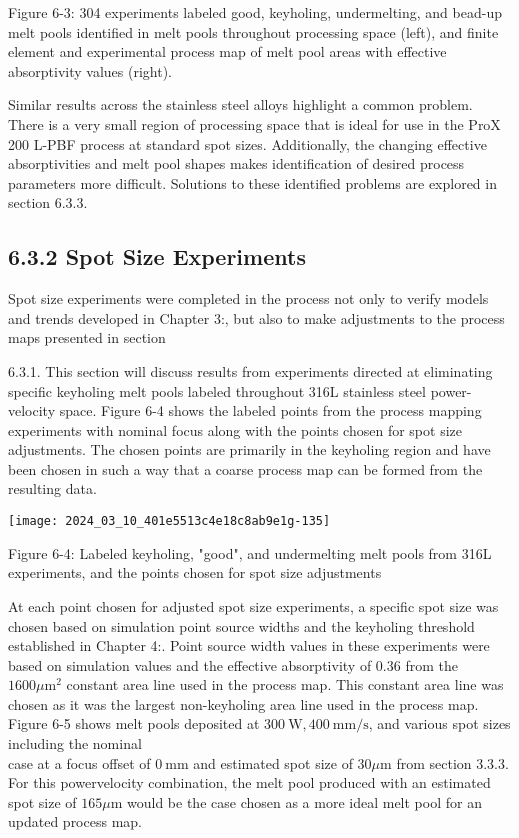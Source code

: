 \documentclass[10pt]{article}
\begin{document}
Figure 6-3: 304 experiments labeled good, keyholing, undermelting, and bead-up melt pools identified in melt pools throughout processing space (left), and finite element and experimental process map of melt pool areas with effective absorptivity values (right).

Similar results across the stainless steel alloys highlight a common problem. There is a very small region of processing space that is ideal for use in the ProX 200 L-PBF process at standard spot sizes. Additionally, the changing effective absorptivities and melt pool shapes makes identification of desired process parameters more difficult. Solutions to these identified problems are explored in section 6.3.3.

\subsection*{6.3.2 Spot Size Experiments}
Spot size experiments were completed in the process not only to verify models and trends developed in Chapter 3:, but also to make adjustments to the process maps presented in section

6.3.1. This section will discuss results from experiments directed at eliminating specific keyholing melt pools labeled throughout 316L stainless steel power-velocity space. Figure 6-4 shows the labeled points from the process mapping experiments with nominal focus along with the points chosen for spot size adjustments. The chosen points are primarily in the keyholing region and have been chosen in such a way that a coarse process map can be formed from the resulting data.

\begin{center}
\texttt{[image: 2024\_03\_10\_401e5513c4e18c8ab9e1g-135]}
\end{center}

Figure 6-4: Labeled keyholing, "good", and undermelting melt pools from 316L experiments, and the points chosen for spot size adjustments

At each point chosen for adjusted spot size experiments, a specific spot size was chosen based on simulation point source widths and the keyholing threshold established in Chapter 4:. Point source width values in these experiments were based on simulation values and the effective absorptivity of 0.36 from the $1600 \mu \mathrm{m}^{2}$ constant area line used in the process map. This constant area line was chosen as it was the largest non-keyholing area line used in the process map. Figure 6-5 shows melt pools deposited at $300 \mathrm{~W}, 400 \mathrm{~mm} / \mathrm{s}$, and various spot sizes including the nominal\\
case at a focus offset of $0 \mathrm{~mm}$ and estimated spot size of $30 \mu \mathrm{m}$ from section 3.3.3. For this powervelocity combination, the melt pool produced with an estimated spot size of $165 \mu \mathrm{m}$ would be the case chosen as a more ideal melt pool for an updated process map.
\end{document}
